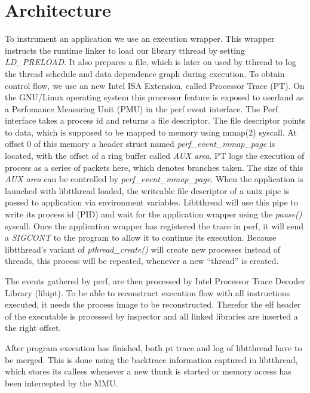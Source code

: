 \section{Architecture}
\label{sec:introduction}

To instrument an application we use an execution wrapper. This wrapper instructs
the runtime linker to load our library tthread by setting \emph{LD\_PRELOAD}. It
also prepares a file, which is later on used by tthread to log the thread
schedule and data dependence graph during execution. To obtain control flow, we
use an new Intel ISA Extension, called Processor Trace (PT). On the GNU/Linux
operating system this processor feature is exposed to userland as a Perfomance
Measuring Unit (PMU) in the perf event interface. The Perf interface takes a
process id and returns a file descriptor. The file descriptor points to data,
which is supposed to be mapped to memory using mmap(2) syscall. At offset 0 of this memory
a header struct named \emph{perf_event_mmap_page} is located, with the offset of
a ring buffer called \emph{AUX area}.
PT logs the execution of process as a series of packets here, which denotes branches taken.
The size of this \emph{AUX area} can be controlled by \emph{perf_event_mmap_page}.
When the application is launched with libtthread loaded, the writeable file descriptor of
a unix pipe is passed to application via environment variables.  Libtthread will
use this pipe to write its process id (PID) and wait for the application wrapper using
the \emph{pause()} syscall. Once the application wrapper has registered the
trace in perf, it will send a \emph{SIGCONT} to the program to allow it to
continue its execution. Because libtthread's variant of \emph{pthread\_create()}
will create new processes instead of threads, this process will be repeated,
whenever a new "`thread"' is created.

The events gathered by perf, are then processed by Intel Processor Trace Decoder Library (libipt).
To be able to reconstruct execution flow with all instructions executed,
it needs the process image to be reconstructed. Therefor the elf header of the
executable is processed by inspector and all linked libraries are inserted a the right offset.

After program execution has finished, both pt trace and log of libtthread have to be merged.
This is done using the backtrace information captured in libtthread, which
stores its callees whenever a new thunk is started or memory access has been
intercepted by the MMU.
